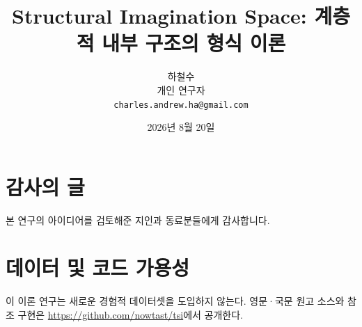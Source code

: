 \documentclass[11pt]{article}
\title{Structural Imagination Space: 계층적 내부 구조의 형식 이론}
\author{하철수\\개인 연구자\\\texttt{charles.andrew.ha@gmail.com}}
\date{2026년 8월 20일}
\begin{document}
\maketitle













\section*{감사의 글}
본 연구의 아이디어를 검토해준 지인과 동료분들에게 감사합니다.

\section*{데이터 및 코드 가용성}
이 이론 연구는 새로운 경험적 데이터셋을 도입하지 않는다. 영문·국문 원고
소스와 참조 구현은 \url{https://github.com/nowtast/tsi}에서 공개한다.


\end{document}
